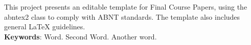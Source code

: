 
\begin{resumo}[ABSTRACT]
\begin{SingleSpacing}

This project presents an editable template for Final Course Papers, using the abntex2 class to comply with ABNT standards. The template also includes general \LaTeX{} guidelines. \\

\textbf{Keywords}: Word. Second Word. Another word.

\end{SingleSpacing}
\end{resumo}
